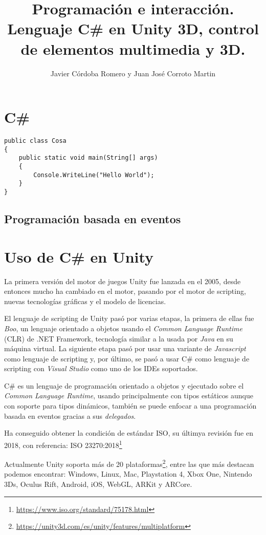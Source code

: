 \documentclass{pre-tfg}
\title{Programación e interacción. Lenguaje C\# en Unity 3D, control de elementos multimedia y 3D.}
\author{Javier Córdoba Romero y Juan José Corroto Martin}
\begin{document}
\maketitle
\tableofcontents

\newpage
\section{C\#}

\begin{lstlisting}[caption=Hello world]
public class Cosa
{
	public static void main(String[] args)
	{
		Console.WriteLine("Hello World");
	}
}
\end{lstlisting}

\subsection{Programación basada en eventos}

\section{Uso de C\# en Unity}

La primera versión del motor de juegos Unity fue lanzada en el 2005, desde entonces mucho ha cambiado en el motor, pasando por el motor de scripting, nuevas tecnologías gráficas y el modelo de licencias.

El lenguaje de scripting de Unity pasó por varias etapas, la primera de ellas fue \emph{Boo}, un lenguaje orientado a objetos usando el \emph{Common Language Runtime} (CLR) de .NET Framework, tecnología similar a la usada por \emph{Java} en su máquina virtual. La siguiente etapa pasó por usar una variante de \emph{Javascript} como lenguaje de scripting y, por último, se pasó a usar C\# como lenguaje de scripting con \emph{Visual Studio} como uno de los IDEs soportados.

C\# es un lenguaje de programación orientado a objetos y ejecutado sobre el \emph{Common Language Runtime}, usando principalmente con tipos estáticos aunque con soporte para tipos dinámicos, también se puede enfocar a una programación basada en eventos gracias a sus \emph{delegados}.

Ha conseguido obtener la condición de estándar ISO, su últimya revisión fue en 2018, con referencia: ISO 23270:2018\footnote{\url{https://www.iso.org/standard/75178.html}}

Actualmente Unity soporta más de 20 plataformas\footnote{\url{https://unity3d.com/es/unity/features/multiplatform}}, entre las que más destacan podemos encontrar: Windows, Linux, Mac, Playstation 4, Xbox One, Nintendo 3Ds, Oculus Rift, Android, iOS, WebGL, ARKit y ARCore.
\end{document}
